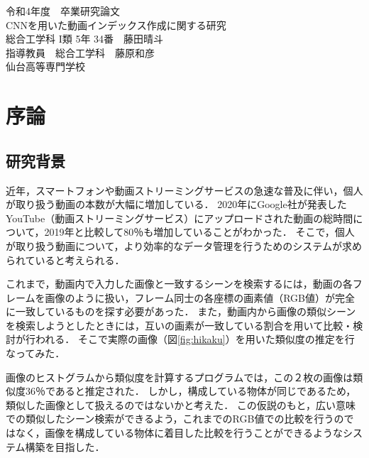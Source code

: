 \documentclass[a4j,12pt,dvipdfmx]{jreport}
\begin{document}
\begin{titlepage}
  \begin{center}
    {\large 令和4年度　卒業研究論文}\\
    \vspace{150truept}
    {\huge CNNを用いた動画インデックス作成に関する研究}\\
    \vspace{300truept}
    {\large 総合工学科 \textnormal{I}類 5年 34番　藤田晴斗}\\
    {\large 指導教員　総合工学科　藤原和彦}\\
    \vspace{30truept}
    {\large 仙台高等専門学校}\\
  \end{center}
\end{titlepage}

\tableofcontents
\clearpage

\chapter{序論}
\label{sec:introducion}

\section{研究背景}
近年，スマートフォンや動画ストリーミングサービスの急速な普及に伴い，個人が取り扱う動画の本数が大幅に増加している．
2020年にGoogle社が発表したYouTube（動画ストリーミングサービス）にアップロードされた動画の総時間について，2019年と比較して80％も増加していることがわかった\cite{google_data}．
そこで，個人が取り扱う動画について，より効率的なデータ管理を行うためのシステムが求められていると考えられる．

これまで，動画内で入力した画像と一致するシーンを検索するには，動画の各フレームを画像のように扱い，フレーム同士の各座標の画素値（RGB値）が完全に一致しているものを探す必要があった．
また，動画内から画像の類似シーンを検索しようとしたときには，互いの画素が一致している割合を用いて比較・検討が行われる．
そこで実際の画像（図\ref{fig:hikaku}）を用いた類似度の推定を行なってみた．

画像のヒストグラムから類似度を計算するプログラムでは，この２枚の画像は類似度36％であると推定された．
しかし，構成している物体が同じであるため，類似した画像として扱えるのではないかと考えた．
この仮説のもと，広い意味での類似したシーン検索ができるよう，これまでのRGB値での比較を行うのではなく，画像を構成している物体に着目した比較を行うことができるようなシステム構築を目指した．
\end{document}
